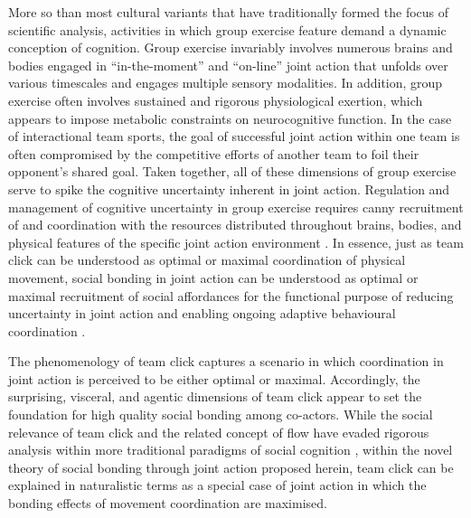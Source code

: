 \begin{CJK}{UTF8}{gbsn}
More so than most cultural variants that have traditionally formed the focus of scientific analysis, activities in which group exercise feature demand a dynamic conception of cognition.  Group exercise invariably involves numerous brains and bodies engaged in ``in-the-moment'' and ``on-line'' joint action that unfolds over various timescales and engages multiple sensory modalities. In addition, group exercise often involves sustained and rigorous physiological exertion, which appears to impose metabolic constraints on neurocognitive function.  In the case of interactional team sports, the goal of successful joint action within one team is often compromised by the competitive efforts of another team to foil their opponent's shared goal.  Taken together, all of these dimensions of group exercise serve to spike the cognitive uncertainty inherent in joint action.  Regulation and management of cognitive uncertainty in group exercise requires canny recruitment of and coordination with the resources distributed throughout brains, bodies, and physical features of the specific joint action environment \citep{Clark2015}.  In essence, just as team click can be understood as optimal or maximal coordination of physical movement, social bonding in joint action can be understood as optimal or maximal recruitment of social affordances for the functional purpose of reducing uncertainty in joint action and enabling ongoing adaptive behavioural coordination \citep{Ramstead2016}.

The phenomenology of team click captures a scenario in which coordination in joint action is perceived to be either optimal or maximal.  Accordingly, the surprising, visceral, and agentic dimensions of team click appear to set the foundation for high quality social bonding among co-actors.  While the social relevance of team click and the related concept of flow have evaded rigorous analysis within more traditional paradigms of social cognition \citep[for explanations as to why, see][]{Dietrich2004,Slingerland2014}, within the novel theory of social bonding through joint action proposed herein, team click can be explained in naturalistic terms as a special case of joint action in which the bonding effects of movement coordination are maximised.


\end{CJK}
